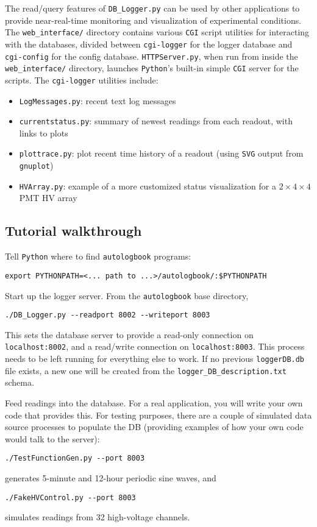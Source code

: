 \documentclass[12pt,english]{article}
\newcommand{\cd}[1]{\texttt{#1}}
\begin{document}
The read/query features of \cd{DB\_Logger.py} can be used by other applications to provide
	near-real-time monitoring and visualization of experimental conditions.
The \cd{web\_interface/} directory contains various \cd{CGI} script utilities for
	interacting with the databases, divided between \cd{cgi-logger} for the logger database
	and \cd{cgi-config} for the config database.
\cd{HTTPServer.py}, when run from inside the \cd{web\_interface/} directory,
	launches \cd{Python}'s built-in simple \cd{CGI} server for the scripts.
The \cd{cgi-logger} utilities include:
\begin{itemize}
	\item \cd{LogMessages.py}: recent text log messages
	\item \cd{currentstatus.py}: summary of newest readings from each readout, with links to plots
	\item \cd{plottrace.py}: plot recent time history of a readout (using \cd{SVG} output from \cd{gnuplot})
	\item \cd{HVArray.py}: example of a more customized status visualization for a $2\times4\times4$ PMT HV array
\end{itemize}

%
%
\subsection{Tutorial walkthrough}

Tell \cd{Python} where to find \cd{autologbook} programs:
\begin{verbatim}
export PYTHONPATH=<... path to ...>/autologbook/:$PYTHONPATH
\end{verbatim}
Start up the logger server.
From the \cd{autologbook} base directory,
\begin{verbatim}
./DB_Logger.py --readport 8002 --writeport 8003
\end{verbatim}
This sets the database server to provide a read-only connection on \cd{localhost:8002},
	and a read/write connection on \cd{localhost:8003}.
This process needs to be left running for everything else to work.
If no previous \cd{loggerDB.db} file exists,
	a new one will be created from the \cd{logger\_DB\_description.txt} schema.

Feed readings into the database.
For a real application, you will write your own code that provides this.
For testing purposes, there are a couple of simulated data source processes to populate the DB
	(providing examples of how your own code would talk to the server):
\begin{verbatim}
./TestFunctionGen.py --port 8003
\end{verbatim}
generates 5-minute and 12-hour periodic sine waves, and
\begin{verbatim}
./FakeHVControl.py --port 8003
\end{verbatim}
simulates readings from 32 high-voltage channels.
\end{document}
